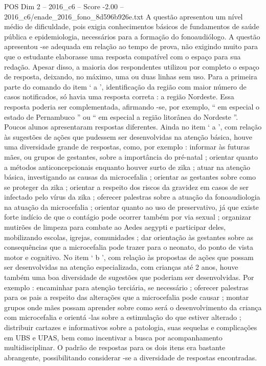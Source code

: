 \begin{textsample}{POS Dim 2 – 2016\_c6 – Score -2.00 – 2016\_c6/enade\_2016\_fono\_8d596b926e.txt}
A questão apresentou um nível médio de dificuldade, pois exigia conhecimentos básicos de fundamentos de saúde pública e epidemiologia, necessários para a formação do fonoaudiólogo.
A questão apresentou -se adequada em relação ao tempo de prova, não exigindo muito para que o estudante elaborasse uma resposta compatível com o espaço para sua redação.
Apesar disso, a maioria dos respondentes utilizou por completo o espaço de resposta, deixando, no máximo, uma ou duas linhas sem uso.
Para a primeira parte do comando do item ‘ a ’, identificação da região com maior número de casos notificados, só havia uma resposta correta : a região Nordeste.
Essa resposta poderia ser complementada, afirmando -se, por exemplo, “ em especial o estado de Pernambuco ” ou “ em especial a região litorânea do Nordeste ”.
Poucos alunos apresentaram respostas diferentes.
Ainda no item ‘ a ’, com relação às sugestões de ações que pudessem ser desenvolvidas na atenção básica, houve uma diversidade grande de respostas, como, por exemplo : informar às futuras mães, ou grupos de gestantes, sobre a importância do pré-natal ; orientar quanto a métodos anticoncepcionais enquanto houver surto de zika ; atuar na atenção básica, investigando as causas da microcefalia ; orientar as gestantes sobre como se proteger da zika ; orientar a respeito dos riscos da gravidez em casos de ser infectado pelo vírus da zika ; oferecer palestras sobre a atuação da fonoaudiologia na atuação da microcefalia ; orientar quanto ao uso de preservativo, já que existe forte indício de que o contágio pode ocorrer também por via sexual ; organizar mutirões de limpeza para combate ao Aedes aegypti e participar deles, mobilizando escolas, igrejas, comunidades ; dar orientação às gestantes sobre as consequências que a microcefalia pode trazer para o neonato, do ponto de vista motor e cognitivo.
No item ‘ b ’, com relação às propostas de ações que possam ser desenvolvidas na atenção especializada, com crianças até 2 anos, houve também uma boa diversidade de sugestões que poderiam ser desenvolvidas.
Por exemplo : encaminhar para atenção terciária, se necessário ; oferecer palestras para os pais a respeito das alterações que a microcefalia pode causar ; montar grupos onde mães possam aprender sobre como será o desenvolvimento da criança com microcefalia e orientá -las sobre a estimulação do que estiver alterado ; distribuir cartazes e informativos sobre a patologia, suas sequelas e complicações em UBS e UPAS, bem como incentivar a busca por acompanhamento multidisciplinar.
O padrão de respostas para os dois itens era bastante abrangente, possibilitando considerar -se a diversidade de respostas encontradas.

\end{textsample}
